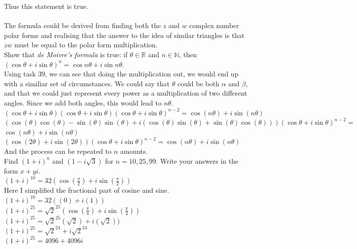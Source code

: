 \documentclass[12pt]{article}
\begin{document}
Thus this statement is true.\\

\\
The formula could be derived from finding both the $z$ and $w$ complex number polar forms and realising that the answer to the idea of similar triangles is that $zw$ must be equal to the polar form multiplication.\\ 

 Show that \textit{de Moivre's formula} is true: if $\theta \in \mathbb{R}$ and $n \in \mathbb{N}$, then\\
$(\cos\theta + i\sin\theta)^n = \cos n\theta + i\sin n\theta$.\\

Using task 39, we can see that doing the multiplication out, we would end up with a similiar set of circumstances. 
We could say that $\theta$ could be both $\alpha$ and $\beta$, and that we could just represent every power as a multiplication of two different angles.
Since we add both angles, this would lead to $n\theta$.\\

$(\cos\theta + i\sin\theta)(\cos\theta + i\sin\theta)(\cos\theta + i\sin\theta)^{n-2} = \cos(n\theta) + i\sin(n\theta)$\\
$(\cos(\theta)\cos(\theta) - \sin(\theta)\sin(\theta) + i(\cos(\theta)\sin(\theta) + \sin(\theta)\cos(\theta)))(\cos\theta + i\sin\theta)^{n-2} = $ \\
$\cos(n\theta) + i\sin(n\theta)$\\
$(\cos(2\theta) + i\sin(2\theta))(\cos\theta + i\sin\theta)^{n-2} = \cos(n\theta) + i\sin(n\theta)$\\

And the process can be repeated to $n$ amounts.\\



 Find $(1+i)^n$ and $(1-i\sqrt{3})$ for $n = 10,25,99$. Write your answers in the form $x + yi$.\\

$(1 + i)^{10} = 32(\cos(\frac{\pi}{2}) + i\sin(\frac{\pi}{2}))$\\
Here I simplified the fractional part of cosine and sine.\\
$(1+ i)^{10} = 32((0) + i(1))$\\


$(1 + i)^{25} = \sqrt{2}^{25}(\cos(\frac{\pi}{4}) + i\sin(\frac{\pi}{4}))$\\
$(1 + i)^{25} = \sqrt{2}^{25}(\sqrt{2}) + i(\sqrt{2}))$\\
$(1 + i)^{25} = \sqrt{2}^{24} + i\sqrt{2}^{24}$\\
$(1 + i)^{25} = 4096 + 4096i$\\
\end{document}
